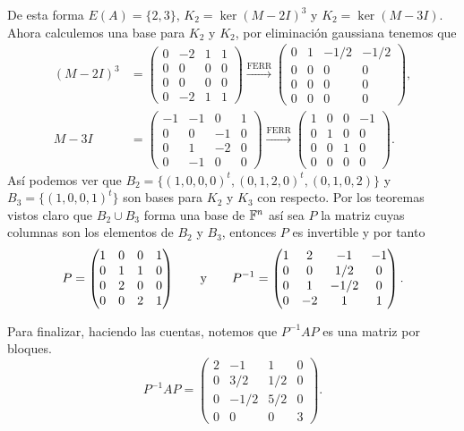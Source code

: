 \begin{example}
  De esta forma $E(A) = \{2,3\}$, $K_2 = \ker(M-2I)^3$ y $K_2 = \ker(M-3I)$. Ahora calculemos una base para $K_2$ y $K_2$, por eliminación gaussiana tenemos que
    \begin{align*}
      (M-2I)^3 &= \begin{pmatrix} 0 &-2 & 1 & 1 \\ 0 & 0 & 0 & 0 \\ 0 & 0 & 0 & 0 \\ 0 & -2 & 1 & 1 \end{pmatrix}
        \xrightarrow{\text{FERR}} \begin{pmatrix} 0 & 1 & -1/2& -1/2\\ 0 & 0 & 0 & 0 \\ 0 & 0 & 0 & 0 \\ 0 & 0 & 0 & 0 \end{pmatrix}, \\
      M-3I &= \begin{pmatrix} -1 & -1 & 0 & 1 \\ 0 & 0 & -1 & 0 \\ 0 & 1 & -2 & 0 \\ 0 & -1 & 0 & 0 \end{pmatrix}
        \xrightarrow{\text{FERR}} \begin{pmatrix} 1 & 0 & 0 & -1 \\ 0 & 1 & 0 & 0 \\ 0 & 0 & 1 & 0 \\ 0 & 0 & 0 & 0 \end{pmatrix}.
    \end{align*}
  Así podemos ver que $B_2 = \{ (1, 0, 0, 0)^t, (0, 1, 2, 0)^t, (0, 1, 0, 2) \}$ y $B_3 = \{(1, 0, 0, 1)^t\}$ son bases para $K_2$ y $K_3$ con respecto. Por los teoremas vistos claro que $B_2 \cup B_3$ forma una base de $\mathbb{F}^n$ así sea $P$ la matriz cuyas columnas son los elementos de $B_2$ y $B_3$, entonces $P$ es invertible y por tanto
  \[
    P = \begin{pmatrix} 1 & 0 & 0 & 1 \\ 0 & 1 & 1 & 0 \\ 0 & 2 & 0 & 0 \\ 0 & 0 & 2 & 1 \end{pmatrix}
      \qquad\text{y}\qquad
    P^{-1} = \begin{pmatrix} 1 & 2 & -1 & -1 \\ 0 & 0 & 1/2 & 0 \\ 0 & 1 & -1/2 & 0 \\ 0 &-2 & 1 & 1 \end{pmatrix}.
  \]
  
  Para finalizar, haciendo las cuentas, notemos que $P^{-1}AP$ es una matriz por bloques.
  \[
    P^{-1}AP = \begin{pmatrix} 2 & -1 & 1 & 0 \\ 0 & 3/2 & 1/2 & 0 \\ 0 & -1/2 & 5/2 & 0 \\ 0 & 0 & 0 & 3 \end{pmatrix}.
  \]
\end{example}



